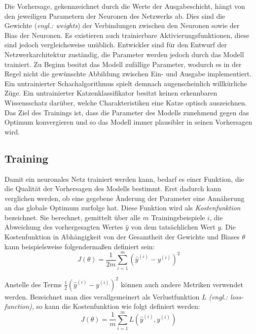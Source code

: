 Die Vorhersage, gekennzeichnet durch die Werte der Ausgabeschicht, hängt von den jeweiligen Parametern der Neuronen des Netzwerks ab. Dies sind die Gewichte (\emph{engl.: weights}) der Verbindungen zwischen den Neuronen sowie der Bias der Neuronen. Es existieren auch trainierbare Aktivierungsfunktionen, diese sind jedoch vergleichsweise unüblich. Entwickler sind für den Entwurf der Netzwerkarchitektur zuständig, die Parameter werden jedoch durch das Modell trainiert. Zu Beginn besitzt das Modell zufällige Parameter, wodurch es in der Regel nicht die gewünschte Abbildung zwischen Ein- und Ausgabe implementiert. Ein untrainierter Schachalgorithmus spielt demnach augenscheinlich willkürliche Züge. Ein untrainierter Katzenklassifikator besitzt keinen erkennbaren Wissensschatz darüber, welche Charakteristiken eine Katze optisch auszeichnen. Das Ziel des Trainings ist, dass die Parameter des Modells zunehmend gegen das Optimum konvergieren und so das Modell immer plausibler in seinen Vorhersagen wird.

\subsection{Training}
Damit ein neuronales Netz trainiert werden kann, bedarf es einer Funktion, die die Qualität der Vorhersagen des Modells bestimmt. Erst dadurch kann verglichen werden, ob eine gegebene Änderung der Parameter eine Annäherung an das globale Optimum zurfolge hat. Diese Funktion wird als \emph{Kostenfunktion} bezeichnet. Sie berechnet, gemittelt über alle $m$ Trainingsbeispiele $i$, die Abweichung des vorhergesagten Wertes $\hat{y}$ von dem tatsächlichen Wert $y$.
Die Kostenfunktion in Abhängigkeit von der Gesamtheit der Gewichte und Biases $\theta$ kann beispielsweise folgendermaßen definiert sein:
\begin{equation}
   \label{eq:costFunction}
   J(\theta) = \frac{1}{2m} \sum_{i=1}^{m} (\hat{y}^{(i)} - y^{(i)})^2
\end{equation}

Anstelle des Terms $\frac{1}{2}(\hat{y}^{(i)} - y^{(i)})^2$ können auch andere Metriken verwendet werden. Bezeichnet man dies verallgemeinert als Verlustfunktion $L$ \emph{(engl.: loss-function)}, so kann die Kostenfunktion wie folgt definiert werden:
\begin{equation}
   \label{eq:costFunctionGeneral}
   J(\theta) = \frac{1}{m} \sum_{i=1}^{m} L(\hat{y}^{(i)}, y^{(i)})
\end{equation}

